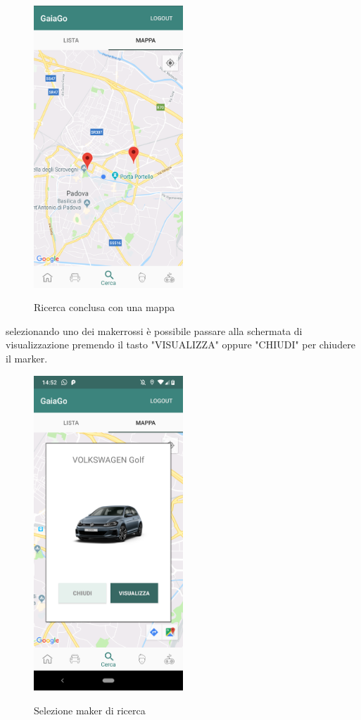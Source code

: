 \begin{itemize}
\begin{figure}[H]
		\includegraphics[width=0.5\textwidth]{res/images/mapparicerca.png}\\
		\caption{Ricerca conclusa con una mappa}
		\label{mappa}
	\end{figure}
	\pagebreak
	selezionando uno dei maker\glosp rossi è possibile passare alla schermata di visualizzazione premendo il tasto "VISUALIZZA" oppure "CHIUDI" per chiudere il marker.
	\begin{figure}[H] 
		\centering 
		\includegraphics[width=0.5\textwidth]{res/images/mapparicerca2.png}\\
		\caption{Selezione maker di ricerca}
		\label{mappa2}
	\end{figure}
\end{itemize}
  
